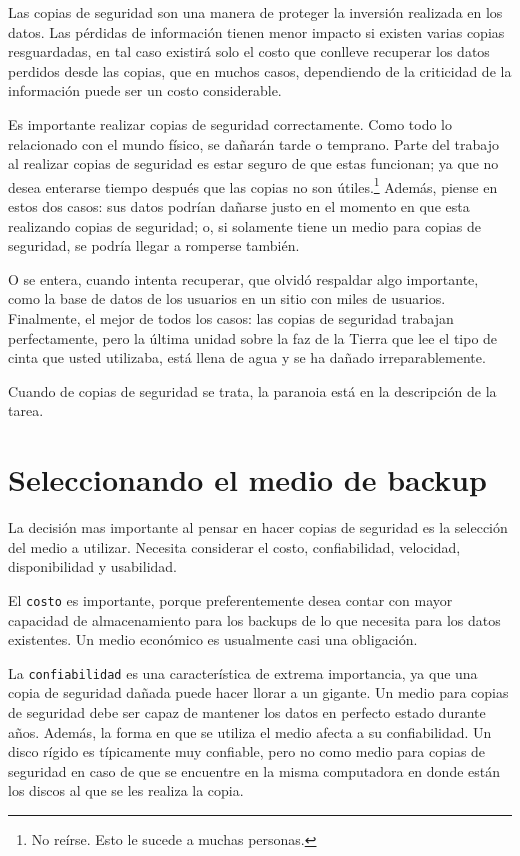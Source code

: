 \documentclass[12pt]{article}
\begin{document}
Las copias de seguridad son una manera de proteger la inversión realizada 
en los datos. Las pérdidas de información tienen menor impacto si existen 
varias copias resguardadas, en tal caso existirá solo el costo que conlleve
recuperar los datos perdidos desde las copias, que en muchos casos, 
dependiendo de la criticidad de la información puede ser un costo 
considerable. 

Es importante realizar copias de seguridad correctamente. Como todo lo 
relacionado con el mundo físico, se dañarán tarde o temprano. Parte del
trabajo al realizar copias de seguridad es estar seguro de que estas 
funcionan; ya que no desea enterarse tiempo después que las copias no son 
útiles.\footnote{No reírse. Esto le sucede a muchas personas.} Además,
 piense en estos dos casos: sus datos podrían dañarse justo en el momento 
en que esta realizando copias de seguridad; o, si solamente tiene un medio 
para copias de seguridad, se podría llegar a romperse también. 

O se entera, cuando intenta recuperar, que olvidó respaldar algo importante,
como la base de datos de los usuarios en un sitio con miles de usuarios. 
Finalmente, el mejor de todos los casos: las copias de seguridad trabajan 
perfectamente, pero la última unidad sobre la faz de la Tierra que lee el 
tipo de cinta que usted utilizaba, está llena de agua y se ha dañado 
irreparablemente.

Cuando de copias de seguridad se trata, la paranoia está en la descripción 
de la tarea.

\section*{Seleccionando el medio de backup}

La decisión mas importante al pensar en hacer copias de seguridad es la 
selección del medio a utilizar. Necesita considerar el costo, 
confiabilidad, velocidad, disponibilidad y usabilidad.

El \texttt{costo} es importante, porque preferentemente desea contar con 
mayor 
capacidad de almacenamiento para los backups de lo que necesita para los 
datos existentes. Un medio económico es usualmente casi una obligación.

La \texttt{confiabilidad} es una característica de extrema importancia, 
ya que una 
copia de seguridad dañada puede hacer llorar a un gigante. Un medio para 
copias de seguridad debe ser capaz de mantener los datos en perfecto 
estado durante años. Además, la forma en que se utiliza el medio afecta 
a su confiabilidad. Un disco rígido es típicamente muy confiable, pero 
no como medio para copias de seguridad en caso de que se encuentre en 
la misma computadora en donde están los discos al que se les realiza la 
copia.
\end{document}
